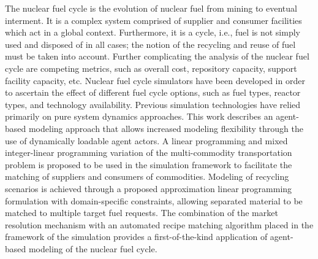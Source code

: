 The nuclear fuel cycle is the evolution of nuclear fuel from mining to eventual
interment. It is a complex system comprised of supplier and consumer facilities
which act in a global context. Furthermore, it is a cycle, i.e., fuel is not
simply used and disposed of in all cases; the notion of the recycling and reuse
of fuel must be taken into account. Further complicating the analysis of the
nuclear fuel cycle are competing metrics, such as overall cost, repository
capacity, support facility capacity, etc. Nuclear fuel cycle simulators have
been developed in order to ascertain the effect of different fuel cycle options,
such as fuel types, reactor types, and technology availability. Previous
simulation technologies have relied primarily on pure system dynamics
approaches. This work describes an agent-based modeling approach that allows
increased modeling flexibility through the use of dynamically loadable agent
actors. A linear programming and mixed integer-linear programming variation of
the multi-commodity transportation problem is proposed to be used in the
simulation framework to facilitate the matching of suppliers and consumers of
commodities. Modeling of recycling scenarios is achieved through a proposed
approximation linear programming formulation with domain-specific constraints,
allowing separated material to be matched to multiple target fuel requests. The
combination of the market resolution mechanism with an automated recipe matching
algorithm placed in the framework of the \Cyclus simulation provides a
first-of-the-kind application of agent-based modeling of the nuclear fuel cycle.